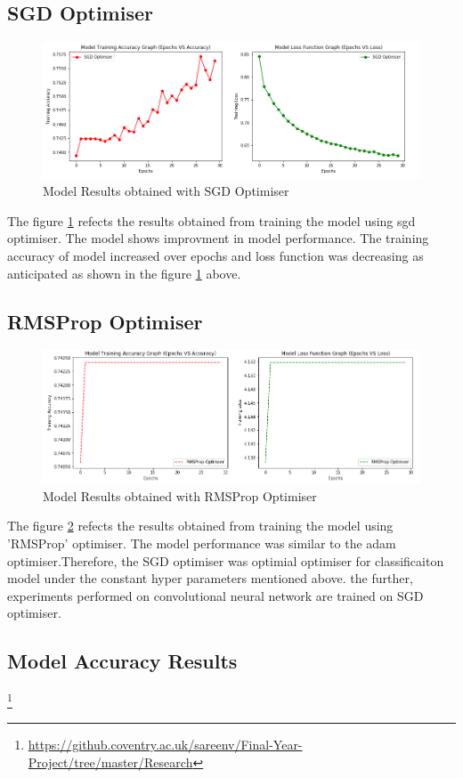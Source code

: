 \subsection{SGD Optimiser}
\begin{figure}[!htp]
    \centering
    \includegraphics[width=15cm]{Images/SGD.png}
    \caption{Model Results obtained with SGD Optimiser}
    \label{fig:sgd}
\end{figure}


The figure \ref{fig:sgd} refects the results obtained from training the model using sgd optimiser. The model shows improvment in model 
performance. The training accuracy of model increased over epochs and loss function was decreasing as anticipated as shown in the figure 
\ref{fig:sgd} above.


\subsection{RMSProp Optimiser}
\begin{figure}[!htp]
    \centering
    \includegraphics[width=15cm]{Images/rmsprop.png}
    \caption{Model Results obtained with RMSProp Optimiser}
    \label{fig:rms}
\end{figure}


The figure \ref{fig:rms} refects the results obtained from training the model using 'RMSProp' optimiser. The model performance was similar to 
the adam optimiser.Therefore, the SGD optimiser was optimial optimiser for classificaiton model under the constant hyper parameters mentioned above.
the further, experiments performed on convolutional neural network are trained on SGD optimiser.

\subsection*{Model Accuracy Results}




\footnote{\url{https://github.coventry.ac.uk/sareenv/Final-Year-Project/tree/master/Research}}
